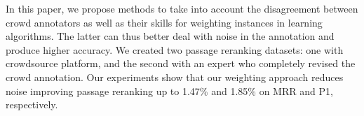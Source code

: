 In this paper, we propose methods to take into account the disagreement between crowd annotators as well as their skills for weighting instances in learning algorithms. The latter can thus better deal with noise in the annotation and produce higher accuracy. We created two passage reranking datasets: one with crowdsource platform, and the second with an expert who completely revised the crowd annotation. Our experiments show that our weighting approach reduces noise improving passage reranking up to 1.47\% and 1.85\% on MRR and P\@1, respectively.
